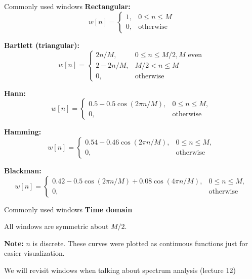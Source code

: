 \documentclass[10pt]{beamer}
\begin{document}
%
\begin{frame}{Commonly used windows} \fontsize{10pt}{10}\selectfont
\textbf{Rectangular:}
\begin{equation*}
w[n] = \begin{cases}
1, &0 \leq n \leq M \\
0, &\text{otherwise}
\end{cases}
\end{equation*}

\textbf{Bartlett (triangular):}
\begin{equation*}
w[n] = \begin{cases}
2n/M, & 0 \leq n \leq M/2, M \text{ even}\\
2 - 2n/M, & M/2 < n \leq M \\
0, & \text{otherwise}
\end{cases}
\end{equation*}

\textbf{Hann:}
\begin{equation*}
w[n] = \begin{cases}
0.5 - 0.5\cos(2\pi n/M), & 0 \leq n \leq M, \\
0, &\text{otherwise}
\end{cases}
\end{equation*}

\textbf{Hamming:}
\begin{equation*}
w[n] = \begin{cases}
0.54 - 0.46\cos(2\pi n/M), & 0 \leq n \leq M, \\
0, &\text{otherwise}
\end{cases}
\end{equation*}

\textbf{Blackman:}
\begin{equation*}
w[n] = \begin{cases}
0.42 - 0.5\cos(2\pi n/M) + 0.08\cos(4\pi n/M), & 0 \leq n \leq M, \\
0, &\text{otherwise}
\end{cases}
\end{equation*}
\end{frame}

%
\begin{frame}{Commonly used windows}
\textbf{Time domain}

All windows are symmetric about $M/2$.

\begin{center}
\resizebox{0.9\textwidth}{!}{}
\end{center}
\textbf{Note:} $n$ is discrete. These curves were plotted as continuous functions just for easier visualization.

We will revisit windows when talking about spectrum analysis (lecture 12)
\end{frame}
\end{document}
